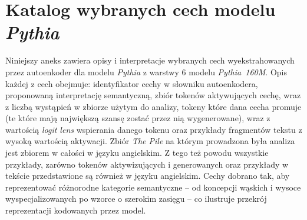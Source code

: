\chapter{Katalog wybranych cech modelu \textit{Pythia}}
\label{appendix:katalog_cech_pythia}
Niniejszy aneks zawiera opisy i interpretacje wybranych cech wyekstrahowanych przez autoenkoder dla modelu \textit{Pythia} z warstwy $6$ modelu \textit{Pythia~160M}. Opis każdej z cech obejmuje: identyfikator cechy w słowniku autoenkodera, proponowaną interpretację semantyczną, zbiór tokenów aktywujących cechę, wraz z liczbą wystąpień w zbiorze użytym do analizy, tokeny które dana cecha promuje (te które mają największą szansę zostać przez nią wygenerowane), wraz z wartością \textit{logit lens} wspierania danego tokenu oraz przykłady fragmentów tekstu z wysoką wartością aktywacji. \newline
Zbiór \textit{The Pile} na którym prowadzona była analiza jest zbiorem w całości w języku angielskim. Z tego też powodu wszystkie przykłady, zarówno tokenów aktywizujących i generowanych oraz przykłady w tekście przedstawione są również w języku angielskim. \newline
Cechy dobrano tak, aby reprezentować różnorodne kategorie semantyczne -- od koncepcji wąskich i wysoce wyspecjalizowanych po wzorce o szerokim zasięgu -- co ilustruje przekrój reprezentacji kodowanych przez model.

\newcommand{\featurefield}[1]{%
  \par\vspace{3pt}%
  {\sffamily\bfseries\small\color{gray!70!black}#1}\par\vspace{1pt}%
}
\newcommand{\tok}[1]{\texttt{\textquotesingle#1\textquotesingle}}
\newcommand{\hltoken}[1]{\colorbox{yellow!30}{\textbf{#1}}}

